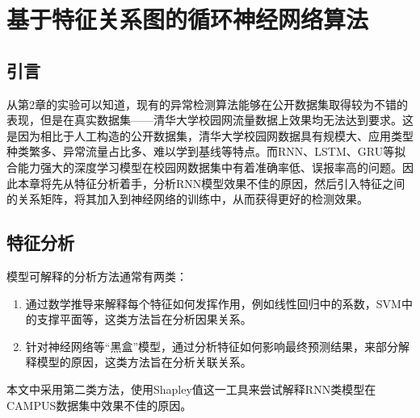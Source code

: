 
\chapter{基于特征关系图的循环神经网络算法}
\section{引言}
从第2章的实验可以知道，现有的异常检测算法能够在公开数据集取得较为不错的表现，但是在真实数据集——清华大学校园网流量数据上效果均无法达到要求。这是因为相比于人工构造的公开数据集，清华大学校园网数据具有规模大、应用类型种类繁多、异常流量占比多、难以学到基线等特点。而RNN、LSTM、GRU等拟合能力强大的深度学习模型在校园网数据集中有着准确率低、误报率高的问题。因此本章将先从特征分析着手，分析RNN模型效果不佳的原因，然后引入特征之间的关系矩阵，将其加入到神经网络的训练中，从而获得更好的检测效果。

\section{特征分析}
模型可解释的分析方法通常有两类：
\begin{enumerate}
  \item 通过数学推导来解释每个特征如何发挥作用，例如线性回归中的系数，SVM中的支撑平面等，这类方法旨在分析因果关系。
  \item 针对神经网络等“黑盒”模型，通过分析特征如何影响最终预测结果，来部分解释模型的原因，这类方法旨在分析关联关系。
\end{enumerate}
本文中采用第二类方法，使用Shapley值这一工具来尝试解释RNN类模型在CAMPUS数据集中效果不佳的原因。






